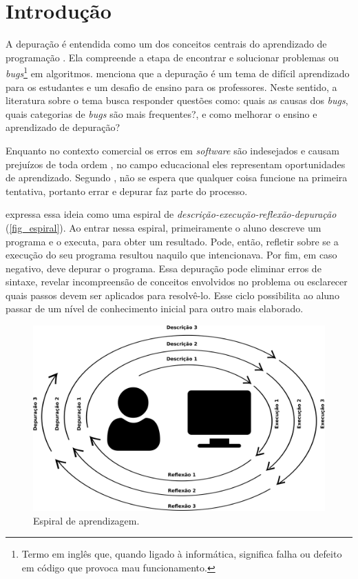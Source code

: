 \chapter{Introdução}
\label{c_introducao}

A depuração é entendida como um dos conceitos centrais do aprendizado de programação \cite{carver_assessing_1986}. Ela compreende a etapa de encontrar e solucionar problemas ou \textit{bugs}\footnote{
    Termo em inglês que, quando ligado à informática, significa falha ou defeito em código que provoca mau funcionamento.
} em algoritmos.  menciona que a depuração é um tema de difícil aprendizado para os estudantes e um desafio de ensino para os professores. Neste sentido, a literatura sobre o tema busca responder questões como: quais as causas dos \textit{bugs}, quais categorias de \textit{bugs} são mais frequentes?, e como melhorar o ensino e aprendizado de depuração?

Enquanto no contexto comercial os erros em \textit{software} são indesejados e causam prejuízos de toda ordem \cite{valdivia-garcia_understanding_2016}, no campo educacional eles representam oportunidades de aprendizado. Segundo , não se espera que qualquer coisa funcione na primeira tentativa, portanto errar e depurar faz parte do processo. 

 expressa essa ideia como uma espiral de \textit{descrição-execução-reflexão-depuração} (\autoref{fig_espiral}). Ao entrar nessa espiral, primeiramente o aluno descreve um programa e o executa, para obter um resultado. Pode, então, refletir sobre se a execução do seu programa resultou naquilo que intencionava. Por fim, em caso negativo, deve depurar o programa. Essa depuração pode eliminar erros de sintaxe, revelar incompreensão de conceitos envolvidos no problema ou esclarecer quais passos devem ser aplicados para resolvê-lo. Esse ciclo possibilita ao aluno passar de um nível de conhecimento inicial para outro mais elaborado.

\begin{figure}[!htpb]
  \centering
  \includegraphics[width=.6\linewidth,fbox]{figs/ciclo_descricao_execucao_reflexao_depuracao.png}
  \caption{Espiral de aprendizagem.}
  \label{fig_espiral}
\end{figure}

